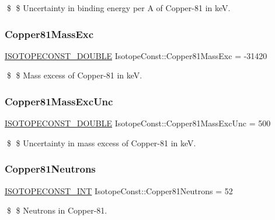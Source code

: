 \$ \$ Uncertainty in binding energy per A of Copper-\/81 in keV. \mbox{\label{group___isotope_const-_copper-_cu81_gadb69b139e2243ad434d0b0674698fc64}} 
\subsubsection{\texorpdfstring{Copper81\+Mass\+Exc}{Copper81MassExc}}
{\footnotesize\ttfamily \mbox{\hyperlink{group___isotope_const-_macros_ga8f45a7272ce02c0b4c65c44636ed719a}{I\+S\+O\+T\+O\+P\+E\+C\+O\+N\+S\+T\+\_\+\+D\+O\+U\+B\+LE}} Isotope\+Const\+::\+Copper81\+Mass\+Exc = -\/31420}

\$ \$ Mass excess of Copper-\/81 in keV. \mbox{\label{group___isotope_const-_copper-_cu81_gaefaba0650d8c5c6c3f3cfd5a99f6f02f}} 
\subsubsection{\texorpdfstring{Copper81\+Mass\+Exc\+Unc}{Copper81MassExcUnc}}
{\footnotesize\ttfamily \mbox{\hyperlink{group___isotope_const-_macros_ga8f45a7272ce02c0b4c65c44636ed719a}{I\+S\+O\+T\+O\+P\+E\+C\+O\+N\+S\+T\+\_\+\+D\+O\+U\+B\+LE}} Isotope\+Const\+::\+Copper81\+Mass\+Exc\+Unc = 500}

\$ \$ Uncertainty in mass excess of Copper-\/81 in keV. \mbox{\label{group___isotope_const-_copper-_cu81_ga4d83a1ccfe043c42b17e105808d502dc}} 
\subsubsection{\texorpdfstring{Copper81\+Neutrons}{Copper81Neutrons}}
{\footnotesize\ttfamily \mbox{\hyperlink{group___isotope_const-_macros_ga5f18360b3e99483a35c32d789e62621c}{I\+S\+O\+T\+O\+P\+E\+C\+O\+N\+S\+T\+\_\+\+I\+NT}} Isotope\+Const\+::\+Copper81\+Neutrons = 52}

\$ \$ Neutrons in Copper-\/81. \mbox{\label{group___isotope_const-_copper-_cu81_ga371215c45852ae76b31a565c19358bb8}} 
